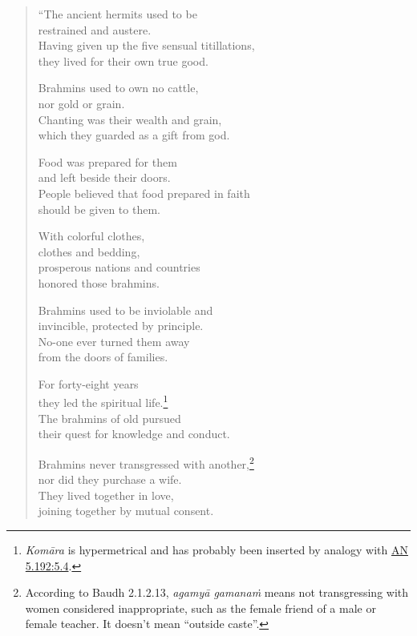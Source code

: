 \documentclass[12pt,openany]{book}%
\begin{document}
\begin{verse}%
“The ancient hermits used to be \\
restrained and austere. \\
Having given up the five sensual titillations, \\
they lived for their own true good. 

Brahmins used to own no cattle, \\
nor gold or grain. \\
Chanting was their wealth and grain, \\
which they guarded as a gift from god. 

Food was prepared for them \\
and left beside their doors. \\
People believed that food prepared in faith \\
should be given to them. 

With colorful clothes, \\
clothes and bedding, \\
prosperous nations and countries \\
honored those brahmins. 

Brahmins used to be inviolable and \\
invincible, protected by principle. \\
No-one ever turned them away \\
from the doors of families. 

For forty-eight years \\
they led the spiritual life.\footnote{\textit{\textsanskrit{Komāra}} is hypermetrical and has probably been inserted by analogy with \href{https://suttacentral.net/an5.192/en/sujato\#5.4}{AN 5.192:5.4}. } \\
The brahmins of old pursued \\
their quest for knowledge and conduct. 

Brahmins never transgressed with another,\footnote{According to Baudh 2.1.2.13, \textit{\textsanskrit{agamyā} \textsanskrit{gamanaṁ}} means not transgressing with women considered inappropriate, such as the female friend of a male or female teacher. It doesn’t mean “outside caste”. } \\
nor did they purchase a wife. \\
They lived together in love, \\
joining together by mutual consent. 


\end{verse}
\end{document}
